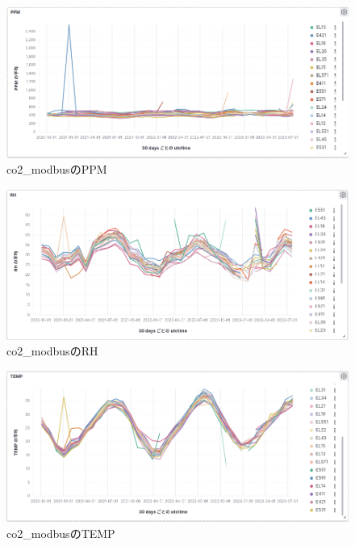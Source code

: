 \begin{figure}[!ht]
    \begin{center}
        \includegraphics[width=160mm]{sotu/figure/ppm.png}
        \caption{co2\_modbusのPPM}
        \label{p12}
    \end{center}
\end{figure}

\begin{figure}[!ht]
    \begin{center}
        \includegraphics[width=160mm]{sotu/figure/rh.png}
        \caption{co2\_modbusのRH}
        \label{p13}
    \end{center}
\end{figure}

\begin{figure}[!ht]
    \begin{center}
        \includegraphics[width=160mm]{sotu/figure/temp.png}
        \caption{co2\_modbusのTEMP}
        \label{p14}
    \end{center}
\end{figure}

